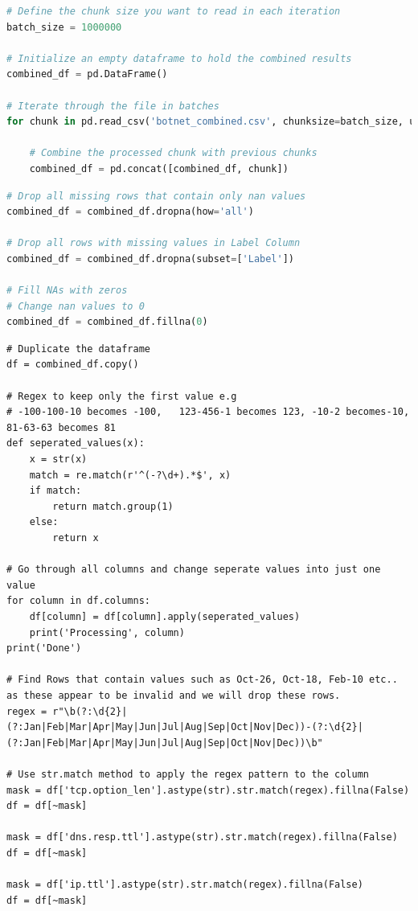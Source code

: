 \begin{appendices}
\begin{lstlisting}[language=Python]
# Define the chunk size you want to read in each iteration
batch_size = 1000000

# Initialize an empty dataframe to hold the combined results
combined_df = pd.DataFrame()

# Iterate through the file in batches
for chunk in pd.read_csv('botnet_combined.csv', chunksize=batch_size, usecols=cols_to_use, low_memory=False):
    
    # Combine the processed chunk with previous chunks
    combined_df = pd.concat([combined_df, chunk])
\end{lstlisting}

\begin{lstlisting}[language=Python,linewidth=\textwidth]
# Drop all missing rows that contain only nan values
combined_df = combined_df.dropna(how='all')

# Drop all rows with missing values in Label Column
combined_df = combined_df.dropna(subset=['Label'])

# Fill NAs with zeros
# Change nan values to 0
combined_df = combined_df.fillna(0)
\end{lstlisting}

\newpage
\begin{lstlisting}
# Duplicate the dataframe
df = combined_df.copy()

# Regex to keep only the first value e.g 
# -100-100-10 becomes -100,   123-456-1 becomes 123, -10-2 becomes-10, 81-63-63 becomes 81
def seperated_values(x):
    x = str(x)
    match = re.match(r'^(-?\d+).*$', x)
    if match:
        return match.group(1)
    else:
        return x

# Go through all columns and change seperate values into just one value
for column in df.columns:
    df[column] = df[column].apply(seperated_values)
    print('Processing', column)
print('Done')

# Find Rows that contain values such as Oct-26, Oct-18, Feb-10 etc.. as these appear to be invalid and we will drop these rows.
regex = r"\b(?:\d{2}|(?:Jan|Feb|Mar|Apr|May|Jun|Jul|Aug|Sep|Oct|Nov|Dec))-(?:\d{2}|(?:Jan|Feb|Mar|Apr|May|Jun|Jul|Aug|Sep|Oct|Nov|Dec))\b"

# Use str.match method to apply the regex pattern to the column
mask = df['tcp.option_len'].astype(str).str.match(regex).fillna(False)
df = df[~mask]

mask = df['dns.resp.ttl'].astype(str).str.match(regex).fillna(False)
df = df[~mask]

mask = df['ip.ttl'].astype(str).str.match(regex).fillna(False)
df = df[~mask]


\end{lstlisting}
\end{appendices}

